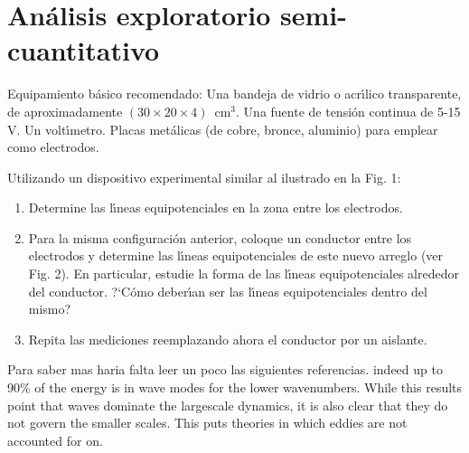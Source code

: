 \documentclass[epj]{svjour}
\begin{document}
\section{An\'alisis exploratorio semi-cuantitativo}

Equipamiento b\'asico recomendado: Una bandeja de vidrio o acr\'\i lico transparente, de aproximadamente $(30 \times 20 \times 4)$~cm$^3$. Una fuente de tensi\'on continua de 5-15 V. Un volt\'\i metro. Placas met\'alicas (de cobre, bronce, aluminio) para emplear como electrodos.

Utilizando un dispositivo experimental similar al ilustrado en la Fig. 1: 

\begin{enumerate}
    \item Determine las l\'\i neas equipotenciales en la zona entre los electrodos.
    \item Para la misma configuraci\'on anterior, coloque un conductor entre los electrodos y determine las l\'\i neas equipotenciales de este nuevo arreglo (ver Fig. 2). En particular, estudie la forma de las  l\'\i neas equipotenciales alrededor del conductor. ?`C\'omo deber\'\i an ser las l\'\i neas equipotenciales dentro del mismo?  
    \item Repita las mediciones reemplazando ahora el conductor por un aislante. 
\end{enumerate}

\begin{sabermas} Para saber mas haria falta leer un poco las siguientes
    referencias.  indeed up to 90\% of the energy is in wave modes for the
    lower wavenumbers. While this results point that waves dominate the
    largescale dynamics, it is also clear that they do not govern the smaller
    scales.  This puts theories in which eddies are not accounted for on.
\end{sabermas}

%  
\end{document}

